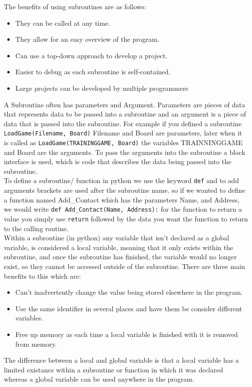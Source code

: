   The benefits of using subroutines are as follows:
  \begin{itemize}
    \setlength\itemsep{0em}
    \item They can be called at any time.
    \item They allow for an easy overview of the program.
    \item Can use a top-down approach to develop a project.
    \item Easier to debug as each subroutine is self-contained.
    \item Large projects can be developed by multiple programmers
  \end{itemize}
  A Subroutine often has parameters and Argument. Parameters are pieces of data that represents data to be passed into a subroutine and an argument is a piece of data that is passed into the subroutine. For example if you defined a subroutine \verb|LoadGame(Filename, Board)| Filename and Board are parameters, later when it is called as \verb|LoadGame(TRAININGGAME, Board)| the variables TRAINNINGGAME and Board are the arguments. To pass the arguments into the subroutine a block interface is used, which is code that describes the data being passed into the subroutine.\\
   To define a subroutine/ function in python we use the keyword \verb|def| and to add arguments brackets are used after the subroutine name. so if we wanted to define a function named Add\_Contact which has the parameters Name, and Address, we would write \verb|def Add_Contact(Name, Address):| for the function to return a value you simply use \verb|return| followed by the data you want the function to return to the calling routine.\\
  Within a subroutine (in python) any variable that isn't declared as a global variable, is considered a local variable, meaning that it only exists within the subroutine, and once the subroutine has finished, the variable would no longer exist, so they cannot be accessed outside of the subroutine. There are three main benefits to this which are:
  \begin{itemize}
    \setlength\itemsep{0em}
    \item Can't inadvertently change the value being stored elsewhere in the program.
    \item Use the same identifier in several places and have them be consider different variables.
    \item Free up memory as each time a local variable is finished with it is removed from memory.
  \end{itemize}
   The difference between a local and global variable is that a local variable has a limited existance within a subroutine or function in which it was declared whereas a global variable can be used anywhere in the program.
  
